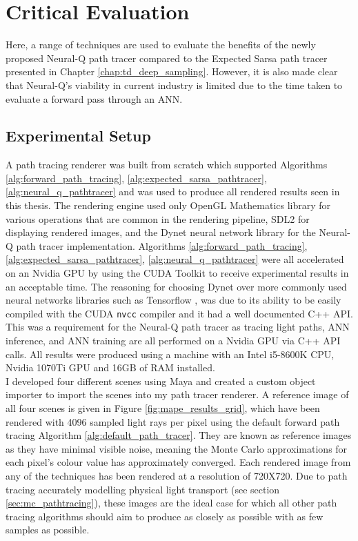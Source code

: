 \documentclass[../dissertation.tex]{subfiles}
\begin{document}
\chapter{Critical Evaluation}

\label{chap:evaluation}

Here, a range of techniques are used to evaluate the benefits of the newly proposed Neural-Q path tracer compared to the Expected Sarsa path tracer presented in Chapter \ref{chap:td_deep_sampling}. However, it is also made clear that Neural-Q's viability in current industry is limited due to the time taken to evaluate a forward pass through an ANN.

\section{Experimental Setup}

A path tracing renderer was built from scratch which supported Algorithms \ref{alg:forward_path_tracing}, \ref{alg:expected_sarsa_pathtracer}, \ref{alg:neural_q_pathtracer} and was used to produce all rendered results seen in this thesis. The rendering engine used only OpenGL Mathematics library \cite{glm} for various operations that are common in the rendering pipeline, SDL2 \cite{sdl2} for displaying rendered images, and the Dynet neural network library \cite{dynet} for the Neural-Q path tracer implementation. Algorithms \ref{alg:forward_path_tracing}, \ref{alg:expected_sarsa_pathtracer}, \ref{alg:neural_q_pathtracer} were all accelerated on an Nvidia GPU by using the CUDA Toolkit \cite{cuda} to receive experimental results in an acceptable time. The reasoning for choosing Dynet over more commonly used neural networks libraries such as Tensorflow \cite{tensorflow2015-whitepaper}, was due to its ability to be easily compiled with the CUDA \verb|nvcc| compiler and it had a well documented C++ API. This was a requirement for the Neural-Q path tracer as tracing light paths, ANN inference, and ANN training are all performed on a Nvidia GPU via C++ API calls. All results were produced using a machine with an Intel i5-8600K CPU, Nvidia 1070Ti GPU and 16GB of RAM installed.\\

I developed four different scenes using Maya \cite{maya} and created a custom object importer to import the scenes into my path tracer renderer. A reference image of all four scenes is given in Figure \ref{fig:mape_results_grid}, which have been rendered with 4096 sampled light rays per pixel using the default forward path tracing Algorithm \ref{alg:default_path_tracer}. They are known as reference images as they have minimal visible noise, meaning the Monte Carlo approximations for each pixel's colour value has approximately converged. Each rendered image from any of the techniques has been rendered at a resolution of 720X720. Due to path tracing accurately modelling physical light transport (see section \ref{sec:mc_pathtracing}), these images are the ideal case for which all other path tracing algorithms should aim to produce as closely as possible with as few samples as possible. 
\end{document}
